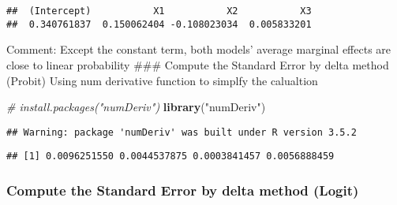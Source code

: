 \documentclass[]{article}
\newenvironment{Shaded}{\begin{snugshade}}{\end{snugshade}}
\newcommand{\KeywordTok}[1]{\textcolor[rgb]{0.13,0.29,0.53}{\textbf{#1}}}
\newcommand{\StringTok}[1]{\textcolor[rgb]{0.31,0.60,0.02}{#1}}
\newcommand{\CommentTok}[1]{\textcolor[rgb]{0.56,0.35,0.01}{\textit{#1}}}
\newcommand{\ControlFlowTok}[1]{\textcolor[rgb]{0.13,0.29,0.53}{\textbf{#1}}}
\newcommand{\OperatorTok}[1]{\textcolor[rgb]{0.81,0.36,0.00}{\textbf{#1}}}
\newcommand{\NormalTok}[1]{#1}
\begin{document}
\begin{Shaded}
\end{Shaded}

\begin{verbatim}
##  (Intercept)           X1           X2           X3 
##  0.340761837  0.150062404 -0.108023034  0.005833201
\end{verbatim}

Comment: Except the constant term, both models' average marginal effects
are close to linear probability \#\#\# Compute the Standard Error by
delta method (Probit) Using num derivative function to simplfy the
calualtion

\begin{Shaded}
\begin{Highlighting}[]
\CommentTok{# install.packages("numDeriv")}
\KeywordTok{library}\NormalTok{(}\StringTok{"numDeriv"}\NormalTok{)}
\end{Highlighting}
\end{Shaded}

\begin{verbatim}
## Warning: package 'numDeriv' was built under R version 3.5.2
\end{verbatim}

\begin{Shaded}
\end{Shaded}

\begin{verbatim}
## [1] 0.0096251550 0.0044537875 0.0003841457 0.0056888459
\end{verbatim}

\subsubsection{Compute the Standard Error by delta method
(Logit)}\label{compute-the-standard-error-by-delta-method-logit}
\end{document}
